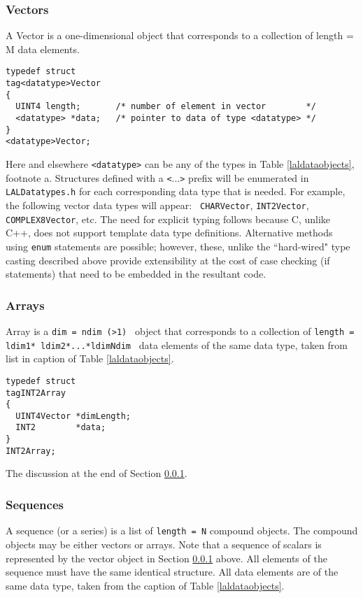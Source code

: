\documentclass[]{ligodcc}
\begin{document}
\subsubsection{Vectors}
\label{vectors}
A Vector is a one-dimensional object that corresponds to a collection
of length = M data elements.
{\footnotesize
\begin{verbatim}
typedef struct
tag<datatype>Vector
{
  UINT4 length;       /* number of element in vector        */
  <datatype> *data;   /* pointer to data of type <datatype> */
}
<datatype>Vector;
\end{verbatim}}

Here and elsewhere  {\tt <datatype>} can be any of the types in
Table \ref{laldataobjects},
footnote a. Structures defined with a {\tt <}...{\tt >} prefix will be
enumerated in {\tt LALDatatypes.h}  for each corresponding data type that is
needed. For example, the following vector data types will appear: {\tt
CHARVector}, {\tt INT2Vector}, {\tt COMPLEX8Vector}, etc. The need for
explicit typing follows because C, unlike C++, does not support
template data type definitions. Alternative methods using {\tt enum}
statements are possible; however, these, unlike the ``hard-wired" type
casting described above provide extensibility at the cost of case
checking (if statements) that need to be embedded in the resultant
code. 


\subsubsection{Arrays}
Array is a {\tt dim = ndim (>1) } object that corresponds to a
collection of {\tt length = ldim1* ldim2*...*ldimNdim } data elements of the
same data type, taken from list in caption of Table
\ref{laldataobjects}.


{\footnotesize
\begin{verbatim}
typedef struct
tagINT2Array
{
  UINT4Vector *dimLength;
  INT2        *data;
}
INT2Array;
\end{verbatim}}

\noindent
The discussion at the end of Section \ref{vectors}.


\subsubsection{Sequences}
\label{sequences}

A sequence (or a series) is a list of {\tt length = N} compound
objects. The compound objects may be either vectors or arrays. Note
that a sequence of scalars is represented by the vector object in
Section \ref{vectors} above.  All elements of the sequence must have the same
identical structure.  All data elements are of the same data type,
taken from the caption of Table \ref{laldataobjects}.
\end{document}

